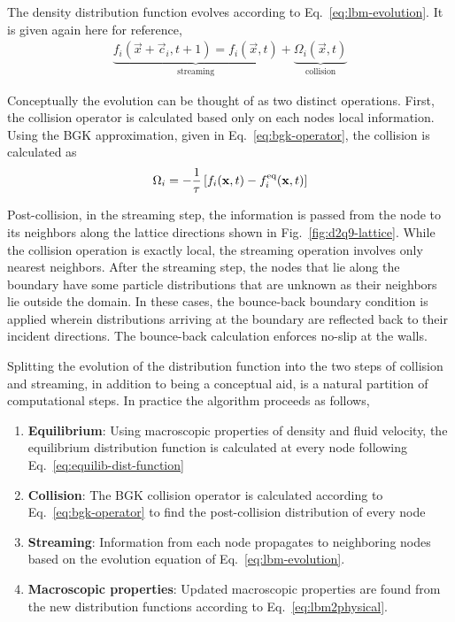 The density distribution function evolves according to Eq.~\ref{eq:lbm-evolution}. It is given again here for reference,
\begin{align}
	\underbrace{f_i(\vec{x}+\vec{c}_i, t + 1)  = f_i(\vec{x},t)}_\text{streaming}  + \underbrace{\Omega_i(\vec{x},t)}_\text{collision}
\end{align}

Conceptually the evolution can be thought of as two distinct operations. First, the collision operator is calculated based only on each nodes local information. Using the BGK approximation, given in Eq.~\ref{eq:bgk-operator}, the collision is calculated as
\begin{align}
	\Omega_i = -\frac{1}{\tau}\left[f_i(\mathbf{x},t) - f_i^{\text{eq}}(\mathbf{x},t)\right]
\end{align}

Post-collision, in the streaming step, the information is passed from the node to its neighbors along the lattice directions shown in Fig.~\ref{fig:d2q9-lattice}. While the collision operation is exactly local, the streaming operation involves only nearest neighbors. After the streaming step, the nodes that lie along the boundary have some particle distributions that are unknown as their neighbors lie outside the domain. In these cases, the bounce-back boundary condition is applied wherein distributions arriving at the boundary are reflected back to their incident directions. The bounce-back calculation enforces no-slip at the walls.

Splitting the evolution of the distribution function into the two steps of collision and streaming, in addition to being a conceptual aid, is a natural partition of computational steps. In practice the algorithm proceeds as follows,\cite{Viggen2009}
\begin{enumerate}
\item{\textbf{Equilibrium}: Using macroscopic properties of density and fluid velocity, the equilibrium distribution function is calculated at every node following Eq.~\ref{eq:equilib-dist-function}}
\item{\textbf{Collision}: The BGK collision operator is calculated according to Eq.~\ref{eq:bgk-operator} to find the post-collision distribution of every node}
\item{\textbf{Streaming}: Information from each node propagates to neighboring nodes based on the evolution equation of Eq.~\ref{eq:lbm-evolution}.}
\item{\textbf{Macroscopic properties}: Updated macroscopic properties are found from the new distribution functions according to Eq.~\ref{eq:lbm2physical}.}
\end{enumerate}

